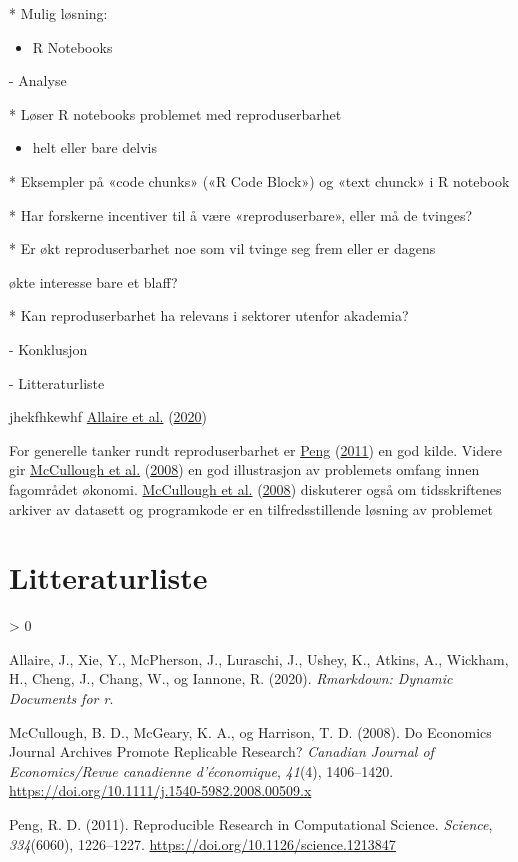\documentclass[
  12pt,
  norsk,
]{article}
\providecommand{\tightlist}{%
  \setlength{\itemsep}{0pt}\setlength{\parskip}{0pt}}
\newlength{\cslhangindent}
\newenvironment{CSLReferences}[2] %
 {%
  \setlength{\parindent}{0pt}
  \ifodd #1 \everypar{\setlength{\hangindent}{\cslhangindent}}\ignorespaces\fi
  \ifnum #2 > 0
  \setlength{\parskip}{#2\baselineskip}
  \fi
 }%
 {}
\begin{document}
* Mulig løsning:

\begin{itemize}
\tightlist
\item
  R Notebooks
\end{itemize}

- Analyse

* Løser R notebooks problemet med reproduserbarhet

\begin{itemize}
\tightlist
\item
  helt eller bare delvis
\end{itemize}

* Eksempler på «code chunks» («R Code Block») og «text chunck» i R
notebook

* Har forskerne incentiver til å være «reproduserbare», eller må de
tvinges?

* Er økt reproduserbarhet noe som vil tvinge seg frem eller er dagens

økte interesse bare et blaff?

* Kan reproduserbarhet ha relevans i sektorer utenfor akademia?

- Konklusjon

- Litteraturliste

jhekfhkewhf \protect\hyperlink{ref-allaire2020}{Allaire et al.}
(\protect\hyperlink{ref-allaire2020}{2020})

For generelle tanker rundt reproduserbarhet er
\protect\hyperlink{ref-peng2011}{Peng}
(\protect\hyperlink{ref-peng2011}{2011}) en god kilde. Videre gir
\protect\hyperlink{ref-mccullough2008}{McCullough et al.}
(\protect\hyperlink{ref-mccullough2008}{2008}) en god illustrasjon av
problemets omfang innen fagområdet økonomi.
\protect\hyperlink{ref-mccullough2008}{McCullough et al.}
(\protect\hyperlink{ref-mccullough2008}{2008}) diskuterer også om
tidsskriftenes arkiver av datasett og programkode er en
tilfredsstillende løsning av problemet

\hypertarget{litteraturliste}{%
\section*{Litteraturliste}\label{litteraturliste}}

\hypertarget{refs}{}
\begin{CSLReferences}{1}{0}
\leavevmode\hypertarget{ref-allaire2020}{}%
Allaire, J., Xie, Y., McPherson, J., Luraschi, J., Ushey, K., Atkins,
A., Wickham, H., Cheng, J., Chang, W., og Iannone, R. (2020).
\emph{Rmarkdown: {Dynamic} Documents for r}.

\leavevmode\hypertarget{ref-mccullough2008}{}%
McCullough, B. D., McGeary, K. A., og Harrison, T. D. (2008). Do
Economics Journal Archives Promote Replicable Research? \emph{Canadian
Journal of Economics/Revue canadienne d'économique}, \emph{41}(4),
1406--1420. \url{https://doi.org/10.1111/j.1540-5982.2008.00509.x}

\leavevmode\hypertarget{ref-peng2011}{}%
Peng, R. D. (2011). Reproducible {Research} in {Computational Science}.
\emph{Science}, \emph{334}(6060), 1226--1227.
\url{https://doi.org/10.1126/science.1213847}

\end{CSLReferences}
\end{document}
